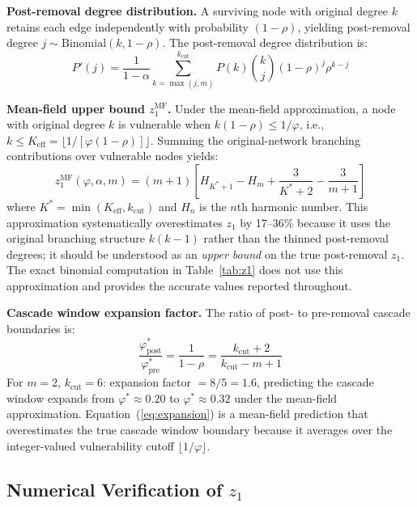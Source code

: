 \documentclass[aps,pre,twocolumn,superscriptaddress,showpacs]{revtex4-2}
\newcommand{\kcut}{k_{\text{cut}}}
\newcommand{\keff}{K_{\text{eff}}}
\begin{document}
\textbf{Post-removal degree distribution.} A surviving node with original degree $k$ retains each edge independently with probability $(1-\rho)$, yielding post-removal degree $j \sim \mathrm{Binomial}(k, 1-\rho)$. The post-removal degree distribution is:
\begin{equation}
P'(j) = \frac{1}{1-\alpha} \sum_{k=\max(j,m)}^{\kcut} P(k) \binom{k}{j} (1-\rho)^j \rho^{k-j}
\label{eq:pprime}
\end{equation}

\textbf{Mean-field upper bound $z_1^{\mathrm{MF}}$.} Under the mean-field approximation, a node with original degree $k$ is vulnerable when $k(1-\rho) \leq 1/\varphi$, i.e., $k \leq \keff = \lfloor 1/[\varphi(1-\rho)] \rfloor$. Summing the original-network branching contributions over vulnerable nodes yields:
\begin{equation}
z_1^{\mathrm{MF}}(\varphi, \alpha, m) = (m+1) \left[ H_{K^*+1} - H_m + \frac{3}{K^*+2} - \frac{3}{m+1} \right]
\label{eq:z1mf}
\end{equation}
where $K^* = \min(\keff, \kcut)$ and $H_n$ is the $n$th harmonic number. This approximation systematically overestimates $z_1$ by 17--36\% because it uses the original branching structure $k(k-1)$ rather than the thinned post-removal degrees; it should be understood as an \emph{upper bound} on the true post-removal $z_1$. The exact binomial computation in Table~\ref{tab:z1} does not use this approximation and provides the accurate values reported throughout.

\textbf{Cascade window expansion factor.} The ratio of post- to pre-removal cascade boundaries is:
\begin{equation}
\frac{\varphi^*_{\mathrm{post}}}{\varphi^*_{\mathrm{pre}}} = \frac{1}{1-\rho} = \frac{\kcut+2}{\kcut - m + 1}
\label{eq:expansion}
\end{equation}
For $m=2$, $\kcut=6$: expansion factor $= 8/5 = 1.6$, predicting the cascade window expands from $\varphi^* \approx 0.20$ to $\varphi^* \approx 0.32$ under the mean-field approximation. Equation~(\ref{eq:expansion}) is a mean-field prediction that overestimates the true cascade window boundary because it averages over the integer-valued vulnerability cutoff $\lfloor 1/\varphi \rfloor$.

\subsection{Numerical Verification of $z_1$}
\label{sec:z1verify}
\end{document}
